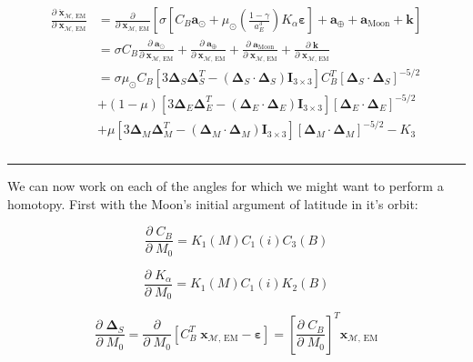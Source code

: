 \documentclass[]{article}
\newcommand{\pd}[2]{\frac{\partial\;#1}{\partial\;#2}}
\newcommand{\pddown}[2]{\frac{\partial}{\partial\;#2} \left[ #1 \right] }
\begin{document}
	\begin{align}
	\begin{split}
		\pd{\ddot{\mathbf{x}}_{\mathcal{M}\text{, EM}}}{ \mathbf{x}_{\mathcal{M}\text{, EM}} } 
		&= \pddown{\sigma \left[ C_B  \mathbf{a}_{\odot} + \mu_\odot \left(\frac{1-\gamma}{a_E^3}\right) K_\alpha \boldsymbol{\varepsilon} \right] + \mathbf{a}_\oplus +  \mathbf{a}_\text{Moon}  + \mathbf{k}}{ \mathbf{x}_{\mathcal{M}\text{, EM}} } \\
		&= \sigma C_B \pd{ \mathbf{a}_{\odot} }{ \mathbf{x}_{\mathcal{M}\text{, EM}} } + \pd{ \mathbf{a}_\oplus }{ \mathbf{x}_{\mathcal{M}\text{, EM}} } + \pd{ \mathbf{a}_\text{Moon} }{ \mathbf{x}_{\mathcal{M}\text{, EM}} } + \pd{ \mathbf{k} }{ \mathbf{x}_{\mathcal{M}\text{, EM}} } \\
		&= \sigma \mu_\odot C_B \left[ 3 \boldsymbol{\Delta}_S \boldsymbol{\Delta}_S^T - (\boldsymbol{\Delta}_S\cdot\boldsymbol{\Delta}_S) \mathbf{I}_{3\times 3} \right] C_B^T [\boldsymbol{\Delta}_S \cdot \boldsymbol{\Delta}_S]^{-5/2} \\
		&+ (1-\mu) \left[ 3 \boldsymbol{\Delta}_E \boldsymbol{\Delta}_E^T - (\boldsymbol{\Delta}_E\cdot\boldsymbol{\Delta}_E) \mathbf{I}_{3\times 3} \right] [\boldsymbol{\Delta}_E \cdot \boldsymbol{\Delta}_E ]^{-5/2} \\
		&+ \mu \left[ 3 \boldsymbol{\Delta}_M \boldsymbol{\Delta}_M^T - (\boldsymbol{\Delta}_M\cdot\boldsymbol{\Delta}_M) \mathbf{I}_{3\times 3} \right] [\boldsymbol{\Delta}_M \cdot \boldsymbol{\Delta}_M ]^{-5/2} - K_3 \\
	\end{split}
	\end{align}
	
	\hrule \vspace{1em}
	
	We can now work on each of the angles for which we might want to perform a homotopy.  First with the Moon's initial argument of latitude in it's orbit:
	
	\begin{equation*}
		\pd{C_B}{M_0} = K_1(M) C_1(i) C_3(B)
	\end{equation*}
	
	\begin{equation*}
		\pd{K_\alpha}{M_0} = K_1(M) C_1(i) K_2(B)
	\end{equation*}
	
	\begin{equation*}
		\pd{\boldsymbol{\Delta}_S}{M_0} = \pddown{C_B^T \; \mathbf{x}_{\mathcal{M}\text{, EM}} - \boldsymbol{\varepsilon}}{M_0} = \left[ \pd{C_B}{M_0} \right]^T \mathbf{x}_{\mathcal{M}\text{, EM}}
	\end{equation*}
	
\end{document}
